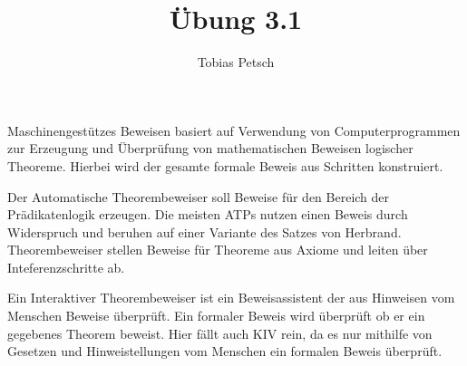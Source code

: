 \documentclass[a4paper,12pt]{article}
\title{Übung 3.1}
\author{Tobias Petsch}
\date{}
\begin{document}
\maketitle

Maschinengestützes Beweisen basiert auf Verwendung von Computerprogrammen zur Erzeugung und Überprüfung von mathematischen Beweisen logischer Theoreme.
Hierbei wird der gesamte formale Beweis aus Schritten konstruiert.

Der Automatische Theorembeweiser soll Beweise für den Bereich der Prädikatenlogik erzeugen. Die meisten ATPs nutzen einen Beweis durch Widerspruch und beruhen auf 
einer Variante des Satzes von Herbrand. Theorembeweiser stellen Beweise für Theoreme aus Axiome und leiten über Inteferenzschritte ab.

Ein Interaktiver Theorembeweiser ist ein Beweisassistent der aus Hinweisen vom Menschen Beweise überprüft. Ein formaler Beweis wird überprüft ob er ein
gegebenes Theorem beweist. Hier fällt auch KIV rein, da es nur mithilfe von Gesetzen und Hinweistellungen vom Menschen ein formalen Beweis überprüft.
\end{document}
